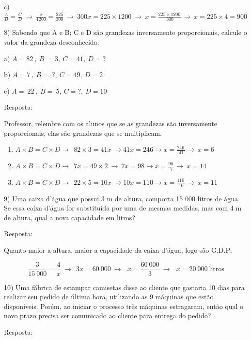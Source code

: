 c)
\(\frac{A}{B} = \frac{C}{D}\  \rightarrow \ \frac{x}{1200} = \frac{225}{300}\  \rightarrow \ 300x = 225 \times 1200\  \rightarrow \ x = \frac{225 \times 1200\ }{300} \rightarrow \ x = 225 \times 4 = 900\)

8) Sabendo que A e B; C e D são grandezas inversamente proporcionais,
calcule o valor da grandeza desconhecida:

a) \(A = 82\ ,\ B = \ 3,\ C = 41,\ D = ?\)

b) \(A = 7\ ,\ B = \ ?,\ C = 49,\ D = 2\)

c) \(A = \ 22\ ,\ B = \ 5,\ C = ?,\ D = 10\)

Resposta:

Professor, relembre com os alunos que se as grandezas são inversamente
proporcionais, elas são grandezas que se multiplicam.

\begin{enumerate}
\def\labelenumi{\alph{enumi})}
\item
  \(A \times B = C \times D \rightarrow \ \ 82 \times 3 = 41x\  \rightarrow 41x = 246 \rightarrow x = \frac{246\ }{41} \rightarrow \ x = 6\)
\item
  \(A \times B = C \times D \rightarrow \ \ 7x = 49 \times 2\  \rightarrow \ 7x = 98 \rightarrow x = \frac{98\ }{7} \rightarrow \ x = 14\)
\item
  \(A \times B = C \times D \rightarrow \ \ 22 \times 5 = 10x\  \rightarrow 10x = 110 \rightarrow x = \frac{110\ }{10} \rightarrow \ x = 11\)
\end{enumerate}

9) Uma caixa d'água que possui 3 m de altura, comporta 15 000 litros de
água. Se essa caixa d'água for substituída por uma de mesmas medidas,
mas com 4 m de altura, qual a nova capacidade em litros?

Resposta:

Quanto maior a altura, maior a capacidade da caixa d'água, logo são
G.D.P:

\[\frac{3}{15\ 000} = \frac{4}{x}\  \rightarrow \ \ 3x = 60\ 000\  \rightarrow \ \ \ x = \frac{60\ 000}{3}\  \rightarrow \ \ \ x = 20\ 000\ \text{litros}\]

10) Uma fábrica de estampar camisetas disse ao cliente que gastaria 10
dias para realizar seu pedido de última hora, utilizando as 9 máquinas
que estão disponíveis. Porém, ao iniciar o processo três máquinas
estragaram, então qual o novo prazo precisa ser comunicado ao cliente
para entrega do pedido?

Resposta:


